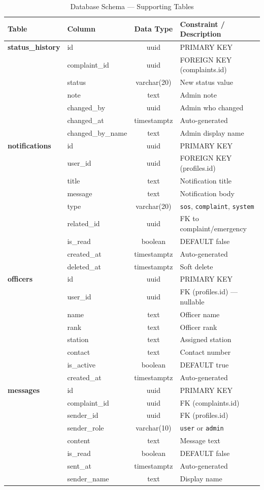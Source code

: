 \documentclass[12pt, a4paper, twoside]{report}
\begin{document}
\begin{table}[ht]
\centering
\caption{Database Schema --- Supporting Tables}
\label{tab:supporting}
\begin{tabularx}{\textwidth}{p{3cm} p{3cm} c X}
\toprule
\textbf{Table} & \textbf{Column} & \textbf{Data Type} & \textbf{Constraint / Description} \\
\midrule
\textbf{status\_history} & id & uuid & PRIMARY KEY \\
& complaint\_id & uuid & FOREIGN KEY (complaints.id) \\
& status & varchar(20) & New status value \\
& note & text & Admin note \\
& changed\_by & uuid & Admin who changed \\
& changed\_at & timestamptz & Auto-generated \\
& changed\_by\_name & text & Admin display name \\
\addlinespace
\textbf{notifications} & id & uuid & PRIMARY KEY \\
& user\_id & uuid & FOREIGN KEY (profiles.id) \\
& title & text & Notification title \\
& message & text & Notification body \\
& type & varchar(20) & \texttt{sos}, \texttt{complaint}, \texttt{system} \\
& related\_id & uuid & FK to complaint/emergency \\
& is\_read & boolean & DEFAULT false \\
& created\_at & timestamptz & Auto-generated \\
& deleted\_at & timestamptz & Soft delete \\
\addlinespace
\textbf{officers} & id & uuid & PRIMARY KEY \\
& user\_id & uuid & FK (profiles.id) --- nullable \\
& name & text & Officer name \\
& rank & text & Officer rank \\
& station & text & Assigned station \\
& contact & text & Contact number \\
& is\_active & boolean & DEFAULT true \\
& created\_at & timestamptz & Auto-generated \\
\addlinespace
\textbf{messages} & id & uuid & PRIMARY KEY \\
& complaint\_id & uuid & FK (complaints.id) \\
& sender\_id & uuid & FK (profiles.id) \\
& sender\_role & varchar(10) & \texttt{user} or \texttt{admin} \\
& content & text & Message text \\
& is\_read & boolean & DEFAULT false \\
& sent\_at & timestamptz & Auto-generated \\
& sender\_name & text & Display name \\
\bottomrule
\end{tabularx}
\end{table}
\end{document}
